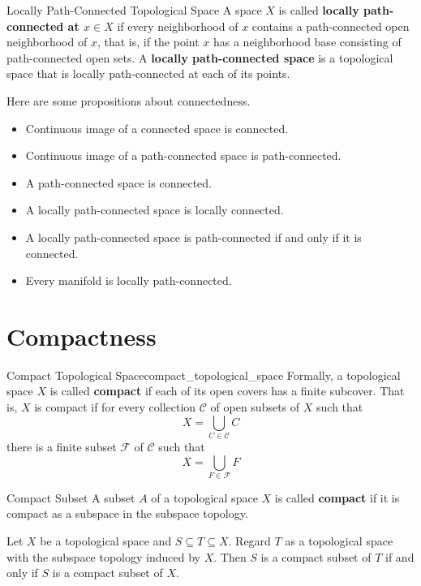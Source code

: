 \documentclass{report}
\begin{document}
\begin{definition}{Locally Path-Connected Topological Space}{}
	A space $X$ is called \textbf{locally path-connected at $x\in X$} if every neighborhood of $x$ contains a path-connected open neighborhood of $x$, that is, if the point $x$ has a neighborhood base consisting of path-connected open sets. A \textbf{locally path-connected space} is a topological space that is locally path-connected at each of its points.
\end{definition}


\begin{proposition}{}{}
	Here are some propositions about connectedness.
	\begin{itemize}
		\item Continuous image of a connected space is connected.
		\item Continuous image of a path-connected space is path-connected.
		\item A path-connected space is connected.
		\item A locally path-connected space is locally connected.
		\item A locally path-connected space is path-connected if and only if it is connected.
		\item Every manifold is locally path-connected.
	\end{itemize}

\end{proposition}


\section{Compactness}
\begin{definition}{Compact Topological Space}{compact_topological_space}
	Formally, a topological space $X$ is called \textbf{compact} if each of its open covers has a finite subcover. That is, $X$ is compact if for every collection $\mathcal{C}$ of open subsets of $X$ such that
	\[
		X=\bigcup_{C \in \mathcal{C}} C
	\]
	there is a finite subset $\mathcal{F}$ of $\mathcal{C}$ such that
	\[
		X=\bigcup_{F \in \mathcal{F}} F
	\]
\end{definition}

\begin{definition}{Compact Subset}{}
	A subset $A$ of a topological space $X$ is called \textbf{compact} if it is compact as a subspace in the subspace topology.
\end{definition}


\begin{lemma}{}{}
	Let $X$ be a topological space and $S \subseteq T \subseteq X$. Regard $T$ as a topological space with the subspace topology induced by $X$. Then $S$ is a compact subset of $T$ if and only if $S$ is a compact subset of $X$.
\end{lemma}
\end{document}

